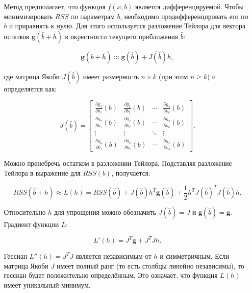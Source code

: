 \documentclass[11pt,a4paper]{article}
\begin{document}
Метод предполагает, что функция $f(x, b)$ является дифференцируемой. Чтобы минимизировать $RSS$ по параметрам $b$, необходимо продифференцировать его по $b$ и приравнять к нулю. Для этого используется разложение Тейлора для вектора остатков $\mathbf{g}(\hat b+h)$ в окрестности текущего приближения $\hat b$:

\begin{equation}
\mathbf{g}(\hat b + h) \approx \mathbf{g}(\hat b) + J(\hat b) h,
\end{equation}

где матрица Якоби $J(\hat b)$ имеет размерность  $n \times k$ (при этом  $n \geq k$) и определяется как:

\begin{equation}
J(\hat b) = \begin{bmatrix}
\frac{\partial g_1}{\partial b_1}(b) & \frac{\partial g_1}{\partial b_2}(b) & \cdots & \frac{\partial g_1}{\partial b_k}(b) \\
\frac{\partial g_2}{\partial b_1}(b) & \frac{\partial g_2}{\partial b_2}(b) & \cdots & \frac{\partial g_2}{\partial b_k}(b) \\
\vdots & \vdots & \ddots & \vdots \\
\frac{\partial g_n}{\partial b_1}(b) & \frac{\partial g_n}{\partial b_2}(b) & \cdots & \frac{\partial g_n}{\partial b_k}(b)
\end{bmatrix}.
\end{equation}

Можно пренебречь остатком в разложении Тейлора. Подставляя разложение Тейлора в выражение для $RSS(b)$, получается:

\begin{equation}
RSS(\hat{b} + h) \approx L(h) = RSS(\hat b) + J(\hat b) h^T \mathbf{g}(\hat b) + \frac{1}{2} h^T J(\hat b)^T J(\hat b) h.
\end{equation}

Относительно $h$ для упрощения можно обозначить $J(\hat b) = J$ и $\mathbf{g}(\hat b) = \mathbf{g}$. Градиент функции \( L \):

\begin{equation}
L'(h) = J^T \mathbf{g} + J^T J h.
\end{equation}

Гессиан \( L''(h) = J^T J \) является независимым от \( h \) и симметричным. Если матрица Якоби \( J \) имеет полный ранг (то есть столбцы линейно независимы), то гессиан будет положительно определённым. Это означает, что функция \( L(h) \) имеет уникальный минимум.
\end{document}
